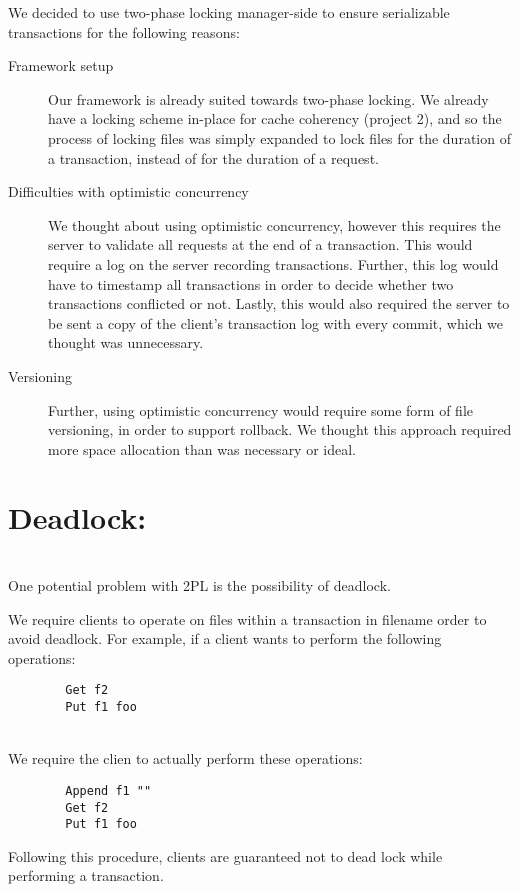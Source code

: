 \documentclass[11pt]{article}
\begin{document}
We decided to use two-phase locking manager-side to ensure serializable transactions for the following reasons:

\begin{description}
	\item[Framework setup] Our framework is already suited towards two-phase locking. We already have a locking scheme in-place for cache coherency (project 2), and so the process of locking files was 
simply expanded to lock files for the duration of a transaction, instead of for the duration of a request.
	\item[Difficulties with optimistic concurrency] We thought about using optimistic concurrency, however this requires the server to validate all requests at the end of a transaction. This would require a log on the server recording transactions. Further, this log would have to timestamp all transactions in order to decide whether two transactions conflicted or not. Lastly, this would also required the server to be sent a copy of the client's transaction log with every commit, which we thought was unnecessary. 
        \item[Versioning] Further, using optimistic concurrency would require some form of file versioning, in order to support rollback. We thought this approach required more space allocation than was necessary or ideal.\\
\end{description} 

\section{Deadlock:} \\

One potential problem with 2PL is the possibility of deadlock.

We require clients to operate on files within a transaction in filename order to avoid deadlock.
For example, if a client wants to perform the following operations: 
\begin{verbatim}
        Get f2
        Put f1 foo
\end{verbatim}\\
We require the clien to actually perform these operations:
\begin{verbatim}
        Append f1 ""
        Get f2
        Put f1 foo
\end{verbatim}
Following this procedure, clients are guaranteed not to dead lock while performing a transaction.
\end{document}
